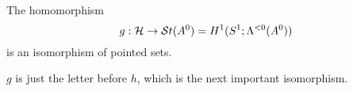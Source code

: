 \begin{tthm}
  The homomorphism
  \[
    g:\mathcal{H}\to\mathcal{S}{}t(A^0)=H^1(S^1;\Lambda^{<0}(A^0))
  \]
  is an isomorphism of pointed  sets.
  \begin{rem}
    $g$ is just the letter before $h$, which is the next important isomorphism.
  \end{rem}
\end{tthm}
\begin{comment}
  \begin{rem}
    \marginnote{\cite{Loday1994} Remark I.2.2}
    To another normal form $A^1={}^f\!A^0$ there correspond cochains which are
    conjugated via $f$.
    We get the following commutative diagram:
    \[ \begin{tikzcd}
        G\backslash\hat G(A^1) \rar{\cdot\Phi}\dar{\exp} 
        & G\backslash\hat G(A^0) \dar{\exp}
        & \hat F \arrow[|->]{r}\arrow[|->]{d}
        & \hat F\Phi \arrow[|->]{d}
      \\ H^1(S^1;\lambda(A^1)) \rar
        & H^1(S^1;\lambda(A^0))
        & \exp_{\mu_1}(\hat F) \arrow[|->]{r}
        & \exp_{\mu_0}(\hat F\Phi)
    \end{tikzcd} \]
    where $\exp_{\mu_0}(\hat F\Phi)=\Phi^{-1}\exp_{\mu_0}(\hat F)\Phi$.
  \end{rem}
\end{comment}

